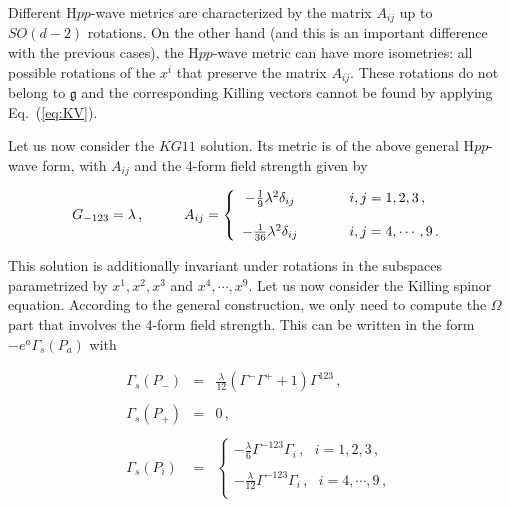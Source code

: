 \documentclass[12pt,a4paper]{article}
\begin{document}
Different H$pp$-wave metrics are characterized by the matrix $A_{ij}$
up to $SO(d-2)$ rotations. On the other hand (and this is an important
difference with the previous cases), the H$pp$-wave metric can have
more isometries: all possible rotations of the $x^{i}$ that preserve
the matrix $A_{ij}$. These rotations do not belong to $\mathfrak{g}$
and the corresponding Killing vectors cannot be found by applying
Eq.~(\ref{eq:KV}). 

Let us now consider the $KG11$ solution. Its metric is of the above
general H$pp$-wave form, with $A_{ij}$ and the 4-form field strength
given by

\begin{equation}
G_{-123}= \lambda\, ,
\hspace{1cm}
A_{ij}= 
\left\{
  \begin{array}{ccl}
-\frac{1}{9}\lambda^{2}\delta_{ij} & \hspace{.6cm} & i,j=1,2,3\, ,\\
& & \\
-\frac{1}{36}\lambda^{2}\delta_{ij} & \hspace{.6cm} & i,j=4,\cdots,9\, .\\
  \end{array}
\right.
\end{equation}

This solution is additionally invariant under rotations in the
subspaces parametrized by $x^{1},x^{2},x^{3}$ and
$x^{4},\cdots,x^{9}$. Let us now consider the Killing spinor equation.
According to the general construction, we only need to compute the
$\Omega$ part that involves the 4-form field strength. This can be
written in the form $-e^{a}\Gamma_{s}(P_{a})$ with 

\begin{equation}
  \begin{array}{rcl}
\Gamma_{s}(P_{-}) & = & 
\frac{\lambda}{12}(\Gamma^{-}\Gamma^{+}+1)\Gamma^{123}\, , \\
& & \\
\Gamma_{s}(P_{+}) & = & 0\, ,\\
& & \\  
\Gamma_{s}(P_{i}) & = &
\left\{
  \begin{array}{c}
-\frac{\lambda}{6}\Gamma^{-123}\Gamma_{i}\, ,\,\,\,\, i=1,2,3\, ,\\
\\
-\frac{\lambda}{12}\Gamma^{-123}\Gamma_{i}\, ,\,\,\,\, i=4,\cdots,9\, ,\\
    \end{array}
\right. 
\end{array}
\end{equation}
\end{document}
